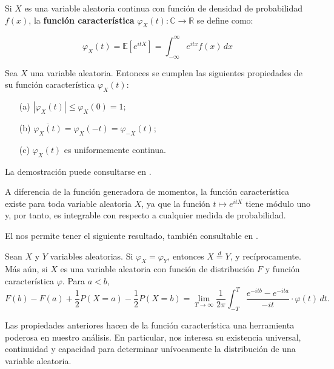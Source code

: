 \documentclass[../Main.tex]{subfiles}
\begin{document}
\begin{definition}
\label{}
    Si \( X \) es una variable aleatoria continua con función de densidad de probabilidad \( f(x) \), la \textbf{función característica} \( \varphi_X(t) :\mathbb{C}\rightarrow\mathbb{R}\) se define como:

\[
\varphi_X(t) = \mathbb{E}[e^{itX}] = \int_{-\infty}^{\infty} e^{itx} f(x) \, dx
\]

\end{definition}
\begin{lemma}
\label{}
    Sea \( X \) una variable aleatoria. Entonces se cumplen las siguientes propiedades de su función característica \( \varphi_X(t) \):
\begin{enumerate}
    \item[(a)] \( \left| \varphi_X(t) \right| \le \varphi_X(0) = 1 \);
    \item[(b)] \( \overline{\varphi_X(t)} = \varphi_X(-t) = \varphi_{-X}(t) \);
    \item[(c)] \( \varphi_X(t) \) es uniformemente continua.
\end{enumerate}
La demostración puede consultarse en \cite{gut2013probability}.
\label{lem:fc}
\end{lemma}
\begin{remark}
\label{}
     A diferencia de la función generadora de momentos, la función característica existe para toda variable aleatoria \( X \), ya que la función \( t \mapsto e^{itX} \) tiene módulo uno y, por tanto, es integrable con respecto a cualquier medida de probabilidad. 
\end{remark}
El  nos permite tener el siguiente resultado, también consultable en \cite{gut2013probability}.
\begin{theorem}
\label{}
Sean \( X \) y \( Y \) variables aleatorias. Si \( \varphi_X = \varphi_Y \), entonces \( X \overset{d}{=} Y \), y recíprocamente. 
Más aún, si \( X \) es una variable aleatoria con función de distribución \( F \) y función característica \( \varphi \). Para \( a < b \),
\[
F(b) - F(a) + \frac{1}{2} P(X = a) - \frac{1}{2} P(X = b)
= \lim_{T \to \infty} \frac{1}{2\pi} \int_{-T}^{T}
\frac{e^{-itb} - e^{-ita}}{-it} \cdot \varphi(t)\, dt.
\]
\label{teo:fc}
\end{theorem}

Las propiedades anteriores hacen de la función característica una herramienta poderosa en nuestro análisis. En particular, nos interesa su existencia universal, continuidad y capacidad para determinar unívocamente la distribución de una variable aleatoria.
 
\end{document}
